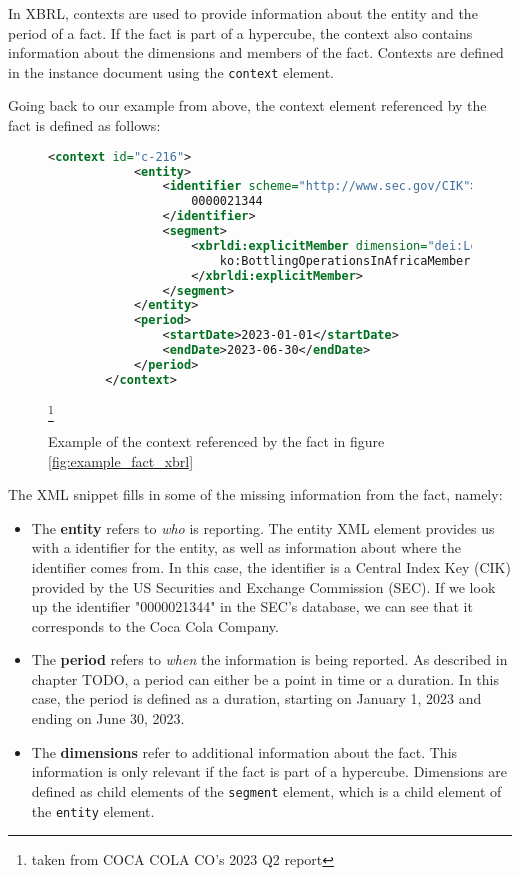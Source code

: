 In XBRL, contexts are used to provide information about the entity and the period of a fact. 
If the fact is part of a hypercube, the context also contains information about the dimensions and members of the fact.
Contexts are defined in the instance document using the \texttt{context} element.

Going back to our example from above, the context element referenced by the fact is defined as follows:

\begin{figure}[H]
    \caption{Example of the context referenced by the fact in figure \ref{fig:example_fact_xbrl}}
    \label{fig:example_context_xbrl}
    \begin{lstlisting}[language=XML]
        <context id="c-216">
            <entity>
                <identifier scheme="http://www.sec.gov/CIK">
                    0000021344
                </identifier>
                <segment>
                    <xbrldi:explicitMember dimension="dei:LegalEntityAxis">
                        ko:BottlingOperationsInAfricaMember
                    </xbrldi:explicitMember>
                </segment>
            </entity>
            <period>
                <startDate>2023-01-01</startDate>
                <endDate>2023-06-30</endDate>
            </period>
        </context>
    \end{lstlisting}
    \footnote[2]{taken from COCA COLA CO's 2023 Q2 report}
\end{figure}

The XML snippet fills in some of the missing information from the fact, namely:

\begin{itemize}
    \item The \textbf{entity} refers to \textit{who} is reporting. 
    The entity XML element provides us with a identifier for the entity, as well as information about where the identifier comes from.
    In this case, the identifier is a Central Index Key (CIK) provided by the US Securities and Exchange Commission (SEC).
    If we look up the identifier "0000021344" in the SEC's database, we can see that it corresponds to the Coca Cola Company.
    \item The \textbf{period} refers to \textit{when} the information is being reported.
    As described in chapter TODO, a period can either be a point in time or a duration.
    In this case, the period is defined as a duration, starting on January 1, 2023 and ending on June 30, 2023.
    \item The \textbf{dimensions} refer to additional information about the fact.
    This information is only relevant if the fact is part of a hypercube.
    Dimensions are defined as child elements of the \texttt{segment} element, 
    which is a child element of the \texttt{entity} element.
\end{itemize}

